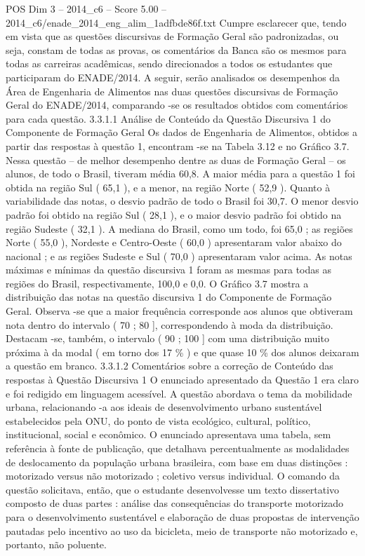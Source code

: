 \begin{textsample}{POS Dim 3 – 2014\_c6 – Score 5.00 – 2014\_c6/enade\_2014\_eng\_alim\_1adfbde86f.txt}
Cumpre esclarecer que, tendo em vista que as questões discursivas de Formação Geral são padronizadas, ou seja, constam de todas as provas, os comentários da Banca são os mesmos para todas as carreiras acadêmicas, sendo direcionados a todos os estudantes que participaram do ENADE/2014.
A seguir, serão analisados os desempenhos da Área de Engenharia de Alimentos nas duas questões discursivas de Formação Geral do ENADE/2014, comparando -se os resultados obtidos com comentários para cada questão. 3.3.1.1 Análise de Conteúdo da Questão Discursiva 1 do Componente de Formação Geral Os dados de Engenharia de Alimentos, obtidos a partir das respostas à questão 1, encontram -se na Tabela 3.12 e no Gráfico 3.7.
Nessa questão – de melhor desempenho dentre as duas de Formação Geral – os alunos, de todo o Brasil, tiveram média 60,8.
A maior média para a questão 1 foi obtida na região Sul ( 65,1 ), e a menor, na região Norte ( 52,9 ).
Quanto à variabilidade das notas, o desvio padrão de todo o Brasil foi 30,7.
O menor desvio padrão foi obtido na região Sul ( 28,1 ), e o maior desvio padrão foi obtido na região Sudeste ( 32,1 ).
A mediana do Brasil, como um todo, foi 65,0 ; as regiões Norte ( 55,0 ), Nordeste e Centro-Oeste ( 60,0 ) apresentaram valor abaixo do nacional ; e as regiões Sudeste e Sul ( 70,0 ) apresentaram valor acima.
As notas máximas e mínimas da questão discursiva 1 foram as mesmas para todas as regiões do Brasil, respectivamente, 100,0 e 0,0.
O Gráfico 3.7 mostra a distribuição das notas na questão discursiva 1 do Componente de Formação Geral.
Observa -se que a maior frequência corresponde aos alunos que obtiveram nota dentro do intervalo ( 70 ; 80 ], correspondendo à moda da distribuição.
Destacam -se, também, o intervalo ( 90 ; 100 ] com uma distribuição muito próxima à da modal ( em torno dos 17 \% ) e que quase 10 \% dos alunos deixaram a questão em branco. 3.3.1.2 Comentários sobre a correção de Conteúdo das respostas à Questão Discursiva 1 O enunciado apresentado da Questão 1 era claro e foi redigido em linguagem acessível.
A questão abordava o tema da mobilidade urbana, relacionando -a aos ideais de desenvolvimento urbano sustentável estabelecidos pela ONU, do ponto de vista ecológico, cultural, político, institucional, social e econômico.
O enunciado apresentava uma tabela, sem referência à fonte de publicação, que detalhava percentualmente as modalidades de deslocamento da população urbana brasileira, com base em duas distinções : motorizado versus não motorizado ; coletivo versus individual.
O comando da questão solicitava, então, que o estudante desenvolvesse um texto dissertativo composto de duas partes : análise das consequências do transporte motorizado para o desenvolvimento sustentável e elaboração de duas propostas de intervenção pautadas pelo incentivo ao uso da bicicleta, meio de transporte não motorizado e, portanto, não poluente.

\end{textsample}
